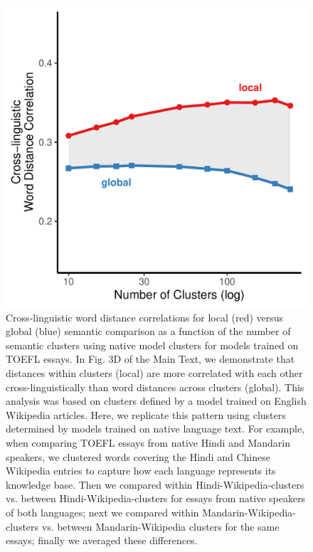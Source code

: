 \documentclass[9pt,twoside,lineno]{pnas-new}
\begin{document}
\begin{figure}[h]
\centering
     \includegraphics[width = 5in]{suppfigs/native_clustering_local_global}
         \caption{Cross-linguistic word distance correlations for local (red) versus global (blue) semantic comparison as a function of the number of semantic clusters using native model clusters for models trained on TOEFL essays. In Fig. 3D of the Main Text, we demonstrate that distances within clusters (local) are more correlated with each other cross-linguistically than word distances across clusters (global). This analysis was based on clusters defined by a model trained on English Wikipedia articles. Here, we replicate this pattern using clusters determined by models trained on native language text. For example, when comparing TOEFL essays from native Hindi and Mandarin speakers, we clustered words covering the Hindi and Chinese Wikipedia entries to capture how each language represents its knowledge base. Then we compared within Hindi-Wikipedia-clusters vs. between Hindi-Wikipedia-clusters for essays from native speakers of both languages; next we compared within Mandarin-Wikipedia-clusters vs. between Mandarin-Wikipedia clusters for the same essays; finally we averaged these differences. }
\end{figure}

\pagebreak
 \clearpage

\end{document}
